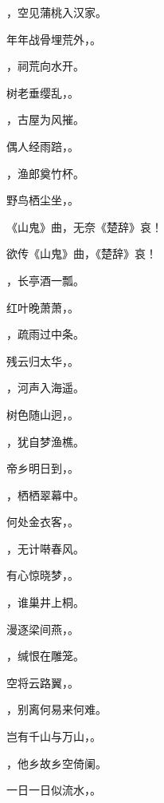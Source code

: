 \documentclass[12pt, a4paper, addpoints, answers]{exam}
\begin{document}
\begin{questions}
\question[3] ，空见蒲桃入汉家。

\question[3] 年年战骨埋荒外，。

\question[3] ，祠荒向水开。

\question[3] 树老垂缨乱，。

\question[3] ，古屋为风摧。

\question[3] 偶人经雨踣，。

\question[3] ，渔郎奠竹杯。

\question[3] 野鸟栖尘坐，。

\question[3] 《山鬼》曲，无奈《楚辞》哀！

\question[3] 欲传《山鬼》曲，《楚辞》哀！

\question[3] ，长亭酒一瓢。

\question[3] 红叶晚萧萧，。

\question[3] ，疏雨过中条。

\question[3] 残云归太华，。

\question[3] ，河声入海遥。

\question[3] 树色随山迥，。

\question[3] ，犹自梦渔樵。

\question[3] 帝乡明日到，。

\question[3] ，栖栖翠幕中。

\question[3] 何处金衣客，。

\question[3] ，无计啭春风。

\question[3] 有心惊晓梦，。

\question[3] ，谁巢井上桐。

\question[3] 漫逐梁间燕，。

\question[3] ，缄恨在雕笼。

\question[3] 空将云路翼，。

\question[3] ，别离何易来何难。

\question[3] 岂有千山与万山，。

\question[3] ，他乡故乡空倚阑。

\question[3] 一日一日似流水，。


\end{questions}
\end{document}
